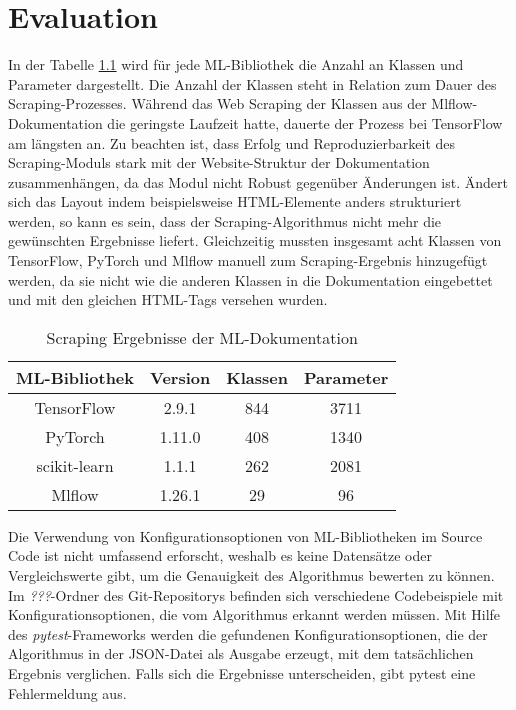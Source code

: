\documentclass[german,bachelor]{swsLeipzig}
\begin{document}
\chapter{Evaluation}\label{Evaluation}
In der Tabelle \ref{scrapresults} wird für jede ML-Bibliothek die Anzahl an Klassen und Parameter dargestellt.
Die Anzahl der Klassen steht in Relation zum Dauer des Scraping-Prozesses.
Während das Web Scraping der Klassen aus der Mlflow-Dokumentation die geringste Laufzeit hatte, dauerte der Prozess bei TensorFlow am längsten an.
Zu beachten ist, dass Erfolg und Reproduzierbarkeit des Scraping-Moduls stark mit der Website-Struktur der Dokumentation zusammenhängen,
da das Modul nicht Robust gegenüber Änderungen ist.
Ändert sich das Layout indem beispielsweise HTML-Elemente anders strukturiert werden, so kann es sein, dass der Scraping-Algorithmus nicht mehr die
gewünschten Ergebnisse liefert.
Gleichzeitig mussten insgesamt acht Klassen von TensorFlow, PyTorch und Mlflow manuell zum Scraping-Ergebnis hinzugefügt werden,
da sie nicht wie die anderen Klassen in die Dokumentation eingebettet und mit den gleichen HTML-Tags versehen wurden.\\

\begin{table}[H]
\small
\begin{center}
\begin{tabular}[h]{c|c|c|c}
\hline
ML-Bibliothek & Version & Klassen & Parameter\\
\hline \hline
TensorFlow & 2.9.1 & 844 & 3711\\
PyTorch & 1.11.0 & 408 & 1340\\
scikit-learn & 1.1.1 & 262 & 2081\\
Mlflow & 1.26.1 & 29 & 96 \\
\hline
\end{tabular}
\caption{Scraping Ergebnisse der ML-Dokumentation} \label{scrapresults}
\end{center}
\end{table}

Die Verwendung von Konfigurationsoptionen von ML-Bibliotheken im Source Code ist nicht umfassend erforscht,
weshalb es keine Datensätze oder Vergleichswerte gibt, um die Genauigkeit des Algorithmus bewerten zu können.
Im \textit{???}-Ordner des Git-Repositorys befinden sich verschiedene Codebeispiele mit Konfigurationsoptionen, die
vom Algorithmus erkannt werden müssen.
Mit Hilfe des \textit{pytest}-Frameworks werden die gefundenen Konfigurationsoptionen, die der Algorithmus in der JSON-Datei als Ausgabe erzeugt,
mit dem tatsächlichen Ergebnis verglichen.
Falls sich die Ergebnisse unterscheiden, gibt pytest eine Fehlermeldung aus.\\
\end{document}

